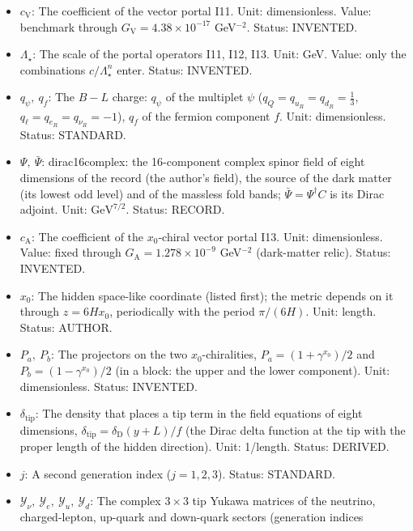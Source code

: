 \documentclass[
  10pt,
]{article}
\begin{document}
\begin{itemize}
  dimensionless. Status: STANDARD.
\item
  \(c_{\mathrm{V}}\): The coefficient of the vector portal I11. Unit:
  dimensionless. Value: benchmark through
  \(G_{\mathrm{V}} = 4.38\times10^{-17}\) GeV\(^{-2}\). Status:
  INVENTED.
\item
  \(\Lambda_\star\): The scale of the portal operators I11, I12, I13.
  Unit: GeV. Value: only the combinations \(c/\Lambda_\star^n\) enter.
  Status: INVENTED.
\item
  \(q_\psi,\ q_f\): The \(B - L\) charge: \(q_\psi\) of the multiplet
  \(\psi\) (\(q_Q = q_{u_R} = q_{d_R} = \frac13\),
  \(q_\ell = q_{e_R} = q_{\nu_R} = -1\)), \(q_f\) of the fermion
  component \(f\). Unit: dimensionless. Status: STANDARD.
\item
  \(\Psi,\ \bar\Psi\): dirac16complex: the 16-component complex spinor
  field of eight dimensions of the record (the author's field), the
  source of the dark matter (its lowest odd level) and of the massless
  fold bands; \(\bar\Psi = \Psi^\dagger C\) is its Dirac adjoint. Unit:
  \(\mathrm{GeV}^{7/2}\). Status: RECORD.
\item
  \(c_{\mathrm{A}}\): The coefficient of the \(x_0\)-chiral vector
  portal I13. Unit: dimensionless. Value: fixed through
  \(G_{\mathrm{A}} = 1.278\times10^{-9}\) GeV\(^{-2}\) (dark-matter
  relic). Status: INVENTED.
\item
  \(x_0\): The hidden space-like coordinate (listed first); the metric
  depends on it through \(z = 6Hx_0\), periodically with the period
  \(\pi/(6H)\). Unit: length. Status: AUTHOR.
\item
  \(P_a,\ P_b\): The projectors on the two \(x_0\)-chiralities,
  \(P_a = (1 + \gamma^{x_0})/2\) and \(P_b = (1 - \gamma^{x_0})/2\) (in
  a block: the upper and the lower component). Unit: dimensionless.
  Status: INVENTED.
\item
  \(\delta_{\mathrm{tip}}\): The density that places a tip term in the
  field equations of eight dimensions,
  \(\delta_{\mathrm{tip}} = \delta_{\mathrm{D}}(y + L)/f\) (the Dirac
  delta function at the tip with the proper length of the hidden
  direction). Unit: 1/length. Status: DERIVED.
\item
  \(j\): A second generation index (\(j = 1, 2, 3\)). Status: STANDARD.
\item
  \(\mathcal{Y}_\nu,\ \mathcal{Y}_e,\ \mathcal{Y}_u,\ \mathcal{Y}_d\):
  The complex \(3 \times 3\) tip Yukawa matrices of the neutrino,
  charged-lepton, up-quark and down-quark sectors (generation indices

\end{itemize}
\end{document}
